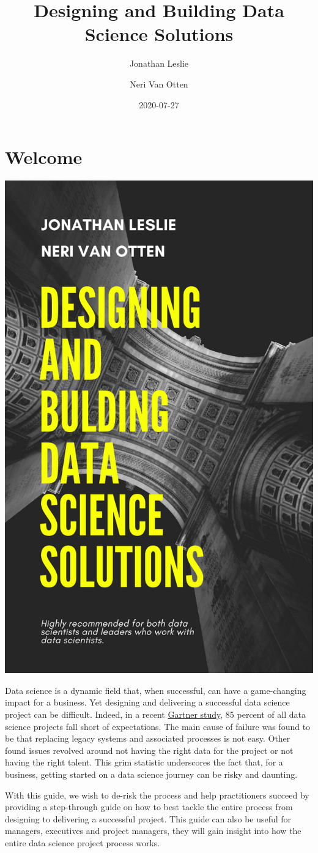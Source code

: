 \documentclass[
]{book}
\title{Designing and Building Data Science Solutions}
\author{Jonathan Leslie \and Neri Van Otten}
\date{2020-07-27}
\begin{document}
\frontmatter
\maketitle

\mainmatter
\hypertarget{welcome}{%
\chapter*{Welcome}\label{welcome}}

\includegraphics[width=0.5\linewidth]{figures/Designing and bulding data science solutions}

Data science is a dynamic field that, when successful, can have a
game-changing impact for a business. Yet designing and delivering a
successful data science project can be difficult. Indeed, in a recent
\href{https://www.gartner.com/en/newsroom/press-releases/2018-02-13-gartner-says-nearly-half-of-cios-are-planning-to-deploy-artificial-intelligence}{Gartner
study}, 85 percent of all data science projects fall short of
expectations. The main cause of failure was found to be that replacing
legacy systems and associated processes is not easy. Other found issues
revolved around not having the right data for the project or not having
the right talent. This grim statistic underscores the fact that, for a
business, getting started on a data science journey can be risky and
daunting.

With this guide, we wish to de-risk the process and help practitioners
succeed by providing a step-through guide on how to best tackle the
entire process from designing to delivering a successful project. This
guide can also be useful for managers, executives and project managers,
they will gain insight into how the entire data science project process
works.
\end{document}

